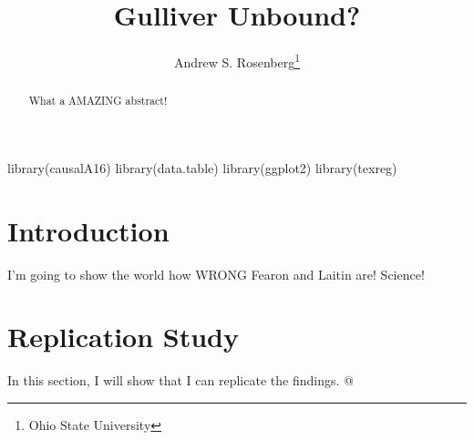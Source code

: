 \documentclass[12pt]{article}\usepackage[]{graphicx}\usepackage[]{color}
\begin{document}
library(causalA16)
library(data.table)
library(ggplot2)
library(texreg)



\title{Gulliver Unbound?}

\author{Andrew S. Rosenberg\thanks{Ohio State University}}

\maketitle

\begin{abstract} \noindent
What a AMAZING abstract!
\end{abstract}

\thispagestyle{empty}

\newpage
\setcounter{page}{1}
\doublespacing

\section*{Introduction}
I'm going to show the world how WRONG Fearon and Laitin are! Science!

\section*{Replication Study}
In this section, I will show that I can replicate the findings.
@
\end{document}
